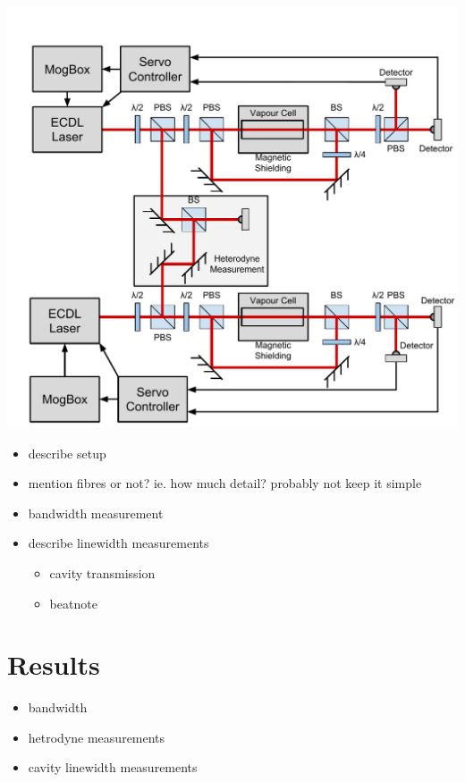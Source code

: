 \documentclass{article}
\newenvironment{Figure}
  {\par\medskip\noindent\minipage{\linewidth}}
  {\endminipage\par\medskip}
\begin{document}
\begin{multicols}{2}
\begin{Figure}
    \centering
    \captionsetup{type=figure}
    \includegraphics[width=\linewidth]{Figs/FullSimplifiedPolSpecSchematicAttempt.pdf}
    \label{polspec_schematic}
\end{Figure}

\begin{itemize}
\item describe setup
\item mention fibres or not? ie. how much detail? probably not keep it simple
\end{itemize}

\begin{itemize}
\item bandwidth measurement
\item describe linewidth measurements
    \begin{itemize}
    \item cavity transmission
    \item beatnote
    \end{itemize}
\end{itemize}


\section{Results}
\begin{itemize}
\item bandwidth
\item hetrodyne measurements
\item cavity linewidth measurements
\end{itemize}


\end{multicols}
\end{document}
